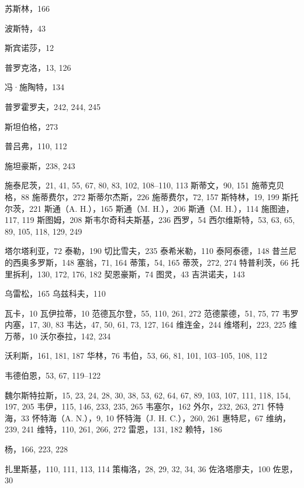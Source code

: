 苏斯林，166

波斯特，43

斯宾诺莎，12

普罗克洛，13, 126

冯·施陶特，134

普罗霍罗夫，242, 244, 245

斯坦伯格，273

普吕弗，110, 112

施坦豪斯，238, 243

施泰尼茨，21, 41, 55, 67, 80, 83, 102, 108--110, 113
斯蒂文，90, 151
施蒂克贝格，88
施蒂费尔，272
斯蒂尔杰斯，226
施蒂费尔，72, 157
斯特林，19, 199
斯托尔茨，221
斯通（A. H.），165
斯通（M. H.），206
斯通（M. H.），114
施图迪，117, 119
斯图姆，208
斯韦尔奇科夫斯基，236
西罗，54
西尔维斯特，53, 63, 65, 89, 105, 118, 129,
249

塔尔塔利亚，72
泰勒，190
切比雪夫，235
泰希米勒，110
泰阿泰德，148
昔兰尼的西奥多罗斯，148
塞翁，71, 164
蒂策，54, 165
蒂茨，272, 274
特普利茨，66
托里拆利，130, 172, 176, 182
契恩豪斯，74
图灵，43
吉洪诺夫，143

乌雷松，165
乌兹科夫，110

瓦卡，10
瓦伊拉蒂，10
范德瓦尔登，55, 110, 261, 272
范德蒙德，51, 75, 77
韦罗内塞，17, 30, 83
韦达，47, 50, 61, 73, 127, 164
维连金，244
维塔利，223, 225
维万蒂，10
沃尔泰拉，142, 234

沃利斯，161, 181, 187
华林，76
韦伯，53, 66, 81, 101, 103--105, 108,
112

韦德伯恩，53, 67, 119--122

魏尔斯特拉斯，15, 23, 24, 28, 30, 38, 53, 62, 64, 67, 89, 103, 107, 111, 118, 154, 197, 205
韦伊，115, 146, 233, 235, 265
韦塞尔，162
外尔，232, 263, 271
怀特海，33
怀特海（A. N.），9, 10
怀特海（J. H. C.），260, 261
惠特尼，67
维纳，239, 241
维特，110, 261, 266, 272
雷恩，131, 182
赖特，186

杨，166, 223, 228

扎里斯基，110, 111, 113, 114
策梅洛，28, 29, 32, 34, 36
佐洛塔廖夫，100
佐恩，30
